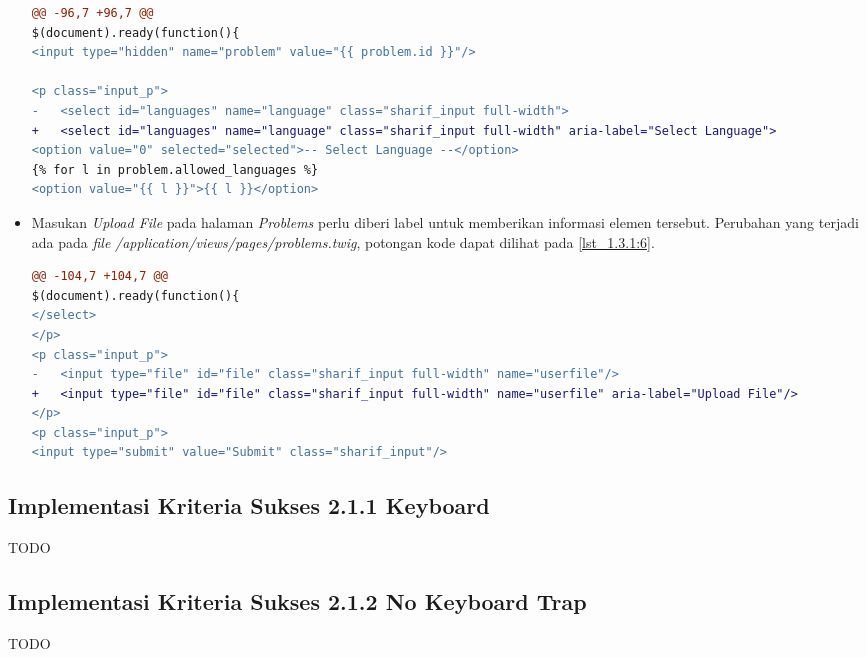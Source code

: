 \begin{itemize}
\begin{lstlisting}[language=diff, caption=Perubahan pada \textit{file} \textit{problems.twig} untuk \textit{Dropdown Select Language}, label=lst_1.3.1:5, basicstyle=\ttfamily, frame=single,
columns=fullflexible, keepspaces=true, breaklines=true]
@@ -96,7 +96,7 @@ 
$(document).ready(function(){
<input type="hidden" name="problem" value="{{ problem.id }}"/>

<p class="input_p">
- 	<select id="languages" name="language" class="sharif_input full-width">
+ 	<select id="languages" name="language" class="sharif_input full-width" aria-label="Select Language">
<option value="0" selected="selected">-- Select Language --</option>
{% for l in problem.allowed_languages %}
<option value="{{ l }}">{{ l }}</option>
\end{lstlisting}

	\item Masukan \textit{Upload File} pada halaman \textit{Problems} perlu diberi label untuk memberikan informasi elemen tersebut. Perubahan yang terjadi ada pada \textit{file} \textit{/application/views/pages/problems.twig}, potongan kode dapat dilihat pada \ref{lst_1.3.1:6}.
	
\begin{lstlisting}[language=diff, caption=Perubahan pada \textit{file} \textit{problems.twig} untuk masukan \textit{Upload \textit{file}}, label=lst_1.3.1:6, basicstyle=\ttfamily, frame=single,
columns=fullflexible, keepspaces=true, breaklines=true]
@@ -104,7 +104,7 @@ 
$(document).ready(function(){
</select>
</p>
<p class="input_p">
- 	<input type="file" id="file" class="sharif_input full-width" name="userfile"/>
+ 	<input type="file" id="file" class="sharif_input full-width" name="userfile" aria-label="Upload File"/>
</p>
<p class="input_p">
<input type="submit" value="Submit" class="sharif_input"/>
\end{lstlisting}
\end{itemize}

\subsection{Implementasi Kriteria Sukses 2.1.1 Keyboard}
\label{subsec:implementasi_A_2.1.1}
TODO

\subsection{Implementasi Kriteria Sukses 2.1.2 No Keyboard Trap}
\label{subsec:implementasi_A_2.1.2}
TODO

